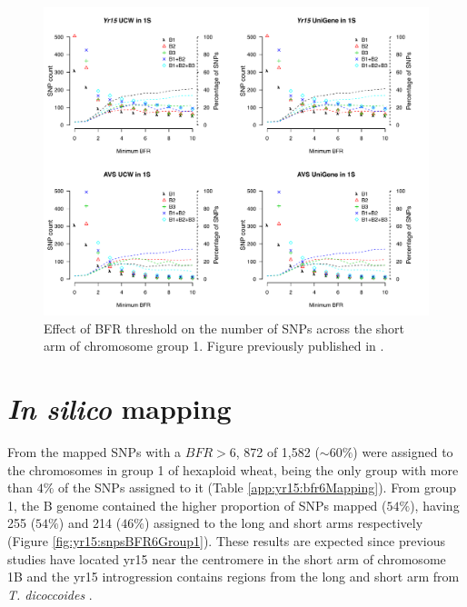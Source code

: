 \begin{figure}
\includegraphics[width=1\textwidth]{Yr15/Figures/bfrChanges.pdf}
\caption[Effect of BFR threshold on the number of SNPs]{Effect of BFR threshold on the number of SNPs across the short arm of chromosome group 1. Figure previously published in \citet{Ramirez-Gonzalez2015b}. }
\label{fig:yr15:bfrChange}
\end{figure}

\section{\textit{In silico} mapping}
\label{sub:yr15:inSilico}
From the mapped SNPs with a $BFR>6$, 872 of 1,582 ($\sim60\%$) were assigned to the chromosomes in group 1 of hexaploid wheat, being the only group with more than $4\%$ of the SNPs assigned to it (Table \ref{app:yr15:bfr6Mapping}). 
From group 1, the B genome contained the higher proportion of SNPs mapped ($54\%$), having 255 ($54\%$) and 214 ($46\%$) assigned to the long and short arms respectively (Figure \ref{fig:yr15:snpsBFR6Group1}).  
These results are expected since previous studies have located \acrshort{yr15} near the centromere in the short arm of chromosome 1B and the \acrshort{yr15} introgression contains regions from the long and short arm from \textit{T. dicoccoides} \citep{Murphy2009,Peng2000,Grama1997}. 

